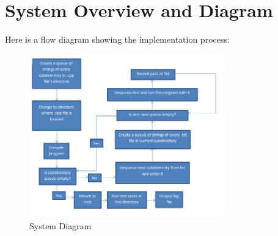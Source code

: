 \section{System Overview and Diagram}
Here is a flow diagram showing the implementation process:

\begin{figure}[tbh]
\begin{center}
\includegraphics[width=0.75\textwidth]{./flowDiagram}
\end{center}
\caption{System Diagram \label{systemdiagram}}
\end{figure}

\let\cleardoublepage\clearpage


